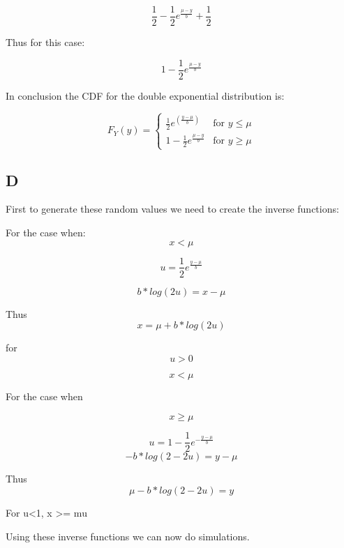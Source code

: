 \documentclass[]{article}
\begin{document}
\[\frac{1}{2} - \frac{1}{2}e^{\frac{\mu-y}{b}} + \frac{1}{2}\]

Thus for this case:

\[1-\frac{1}{2}e^{\frac{\mu-y}{b}}\]

In conclusion the CDF for the double exponential distribution is:

\[F_Y(y)=
\begin{cases}
\frac{1}{2}e^{(\frac{y-\mu}{b})} & \text{for } y \le \mu \\
1-\frac{1}{2}e^{\frac{\mu-y}{b}} & \text{for } y \ge \mu
\end{cases}\]

\hypertarget{d}{%
\subsection{D}\label{d}}

First to generate these random values we need to create the inverse
functions:

For the case when: \[x\lt\mu\]

\[u = \frac{1}{2}e^{\frac{y-\mu}{b}}\]

\[b*log(2u) = x - \mu\]

Thus \[x = \mu + b*log(2u)\]

for \[u>0\]

\[x\lt\mu\]

For the case when

\[x \ge \mu\]

\[u = 1 - \frac{1}{2}e^{-\frac{y-\mu}{b}}\] \[-b*log(2-2u) = y- \mu\]

Thus \[\mu-b*log(2-2u) = y\]

For u\textless{}1, x \textgreater{}= mu

Using these inverse functions we can now do simulations.
\end{document}
